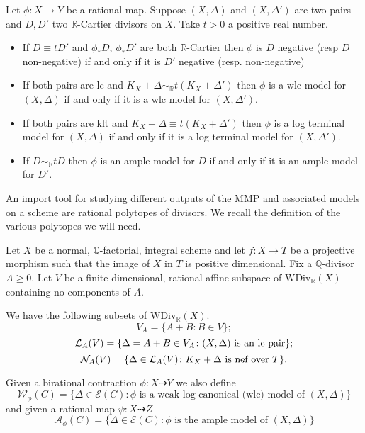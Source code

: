 \begin{lemma}\label{equiv}\cite[Lemma 3.6.8]{BCHM10}
	Let $\phi:X \to Y$ be a rational map. Suppose $(X,\Delta)$ and $(X,\Delta')$ are two pairs and $D,D'$ two $\mathbb{R}$-Cartier divisors on $X$. Take $t >0$ a positive real number.
	\begin{itemize}
		\item If $D \equiv tD'$ and $\phi_{*}D$, $\phi_{*}D'$ are both $\mathbb{R}$-Cartier then $\phi$ is $D$ negative (resp $D$ non-negative) if and only if it is $D'$ negative (resp. non-negative)
		\item If both pairs are lc and $K_{X}+\Delta \sim_{\mathbb{R}} t(K_{X}+\Delta')$ then $\phi$ is a wlc model for $(X,\Delta)$ if and only if it is a wlc model for $(X,\Delta')$.
		\item If both pairs are klt and $K_{X}+\Delta \equiv t(K_{X}+\Delta')$ then $\phi$ is a log terminal model for $(X,\Delta)$ if and only if it is a log terminal model for $(X,\Delta')$.
		\item If $D\sim_{\mathbb{R}} tD$ then $\phi$ is an ample model for $D$ if and only if it is an ample model for $D'$.
	\end{itemize}
\end{lemma}

An import tool for studying different outputs of the MMP and associated models on a scheme are rational polytopes of divisors. We recall the definition of the various polytopes we will need.

\begin{definition}
	Let  $X$ be a normal, $\mathbb{Q}$-factorial, integral scheme and let $f \colon X \to T$ be a projective morphism such that the image of $X$ in $T$ is positive dimensional. 
	Fix a $\mathbb{Q}$-divisor $A\geq 0$. Let $V$ be a finite dimensional, rational affine subspace of $\text{WDiv}_{\mathbb{R}}(X)$ containing no components of $A$.
	
	We have the following subsets of $\text{WDiv}_\mathbb{R}(X)$.
	\[V_{A}= \{A+B \colon B \in V\};\]
	\[\mathcal{L}_{A}(V)=\{\Delta=A+B \in V_{A} \colon (X,\Delta) \textup{ is an lc pair}\};\]
	\[\mathcal{N}_{A}(V)=\{\Delta \in \mathcal{L}_{A}(V) \colon K_{X}+\Delta \textup{ is nef over } T\}.\]
	
	Given a birational contraction $\phi:X \dashrightarrow Y$ we also define
	\[\mathcal{W}_{\phi}(C)=\{\Delta \in \mathcal{E}(C): \phi \text{ is a weak log canonical (wlc) model of } (X,\Delta)\}\]
	and given a rational map $\psi:X \dashrightarrow Z$
	\[\mathcal{A}_{\phi}(C)=\{\Delta \in \mathcal{E}(C): \phi \text{ is the ample model of } (X,\Delta)\}\]
\end{definition}

